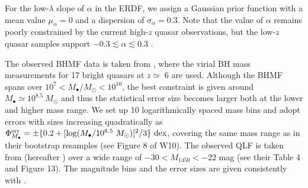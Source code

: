\documentclass[twocolumn, twocolappendix]{aastex63}
\newcommand{\Msun}{M_\odot}
\newcommand{\Mbh}{M_\bullet}
\newcommand{\Muv}{M_{1450}}
\begin{document}
\begin{CJK*}{UTF8}{gbsn}
For the low-$\lambda$ slope of $\alpha$ in the ERDF, we assign a Gaussian prior function with a mean value 
$\mu_{\alpha}=0$ and a dispersion of $\sigma_{\alpha}=0.3$.
Note that the value of $\alpha$ remains poorly constrained by the current high-$z$ quasar observations,
but the low-$z$ quasar samples support $-0.3 \lesssim \alpha \lesssim 0.3$ \citep[e.g., see Figure 21 in][]{2015MNRAS.447.2085S}.


%
The observed BHMF data is taken from , where 
the virial BH mass measurements for 17 bright quasars at $z\simeq $ 6 are used.
Although the BHMF spans over $10^7 < \Mbh/\Msun <10^{10}$, the best constraint is given around 
$\Mbh \simeq 10^{8.5}~\Msun$
and thus the statistical error size becomes larger both at the lower and higher mass range.
We set up 10 logarithmically spaced mass bins and adopt errors with sizes increasing quadratically as 
$\Phi_{\Mbh}^{\rm err} = \pm \{0.2 +   [\log (\Mbh/10^{8.5}~\Msun)]^2/3 \}~{\rm dex}$,
covering the same mass range as in their bootstrap resamples (see Figure 8 of W10). 
The observed QLF is taken from \citet{2018ApJ...869..150M} (hereafter ) 
over a wide range of $-30 < \Muv <-22$ mag (see their Table 4 and Figure 13). 
The magnitude bins and the error sizes are given consistently with .

  


\end{CJK*}
\end{document}
